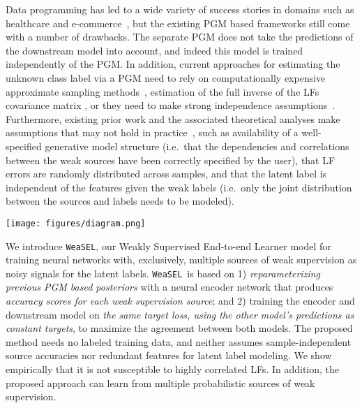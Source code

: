 \documentclass{article}
\newcommand{\weasel}{\texttt{WeaSEL}}\newcommand{\brackets}[1]{\left( #1 \right)}
\begin{document}
Data programming  has led to a wide variety of success stories in domains such as healthcare \cite{fries2019weakly,dunnmon2020cross} and e-commerce~\cite{Drybell}, but the existing PGM based frameworks still come with a number of drawbacks. 
The separate PGM does not take the predictions of the downstream model into account, and indeed this model is trained independently of the PGM.  
In addition, current approaches for estimating the unknown class label via a PGM need to rely on computationally expensive approximate sampling methods~\cite{DP}, estimation of the full inverse of the LFs covariance matrix \cite{Multitask}, or they need to make strong independence assumptions~\cite{triplets}.  
Furthermore, existing prior work and the associated theoretical analyses make assumptions that may not hold in practice~\cite{DP, Multitask, triplets}, such as availability of a  well-specified generative model structure (i.e.\ that the dependencies and correlations between the weak sources have been correctly specified by the user), that LF errors are randomly distributed across samples, and that the latent label is independent of the features given the weak labels (i.e.\ only the joint distribution between the sources and labels needs to be modeled).
\begin{figure*}
    \centering
\texttt{[image: figures/diagram.png]}
\vspace{-1mm}
    \caption{For a task with unobserved ground truth labels $y$, given $m$ sources of weak supervision $\lambda_i$ and training features $X$, \weasel\ trains a downstream model $f$  by maximizing the agreement of its predictions $y_f$ with probabilistic labels $y_e=P_\theta(y=c|\lfs)$ generated by reparameterizing the posterior of prior work with sample-dependent accuracy scores $\theta$ produced by an encoder network $e$.
    }
\label{fig:diagram}
\end{figure*}
 
We introduce \weasel, our Weakly Supervised End-to-end Learner model for training neural networks with, exclusively, multiple sources of weak supervision as noisy signals for the latent labels. \weasel\ is based on 1) \emph{reparameterizing previous PGM based posteriors} with a neural encoder network that produces \emph{accuracy scores for each weak supervision source}; and 2) training the encoder and downstream model on \emph{the same target loss, using the other model's predictions as constant targets}, to maximize the agreement between both models.
The proposed method needs no labeled training data, and neither assumes sample-independent source accuracies nor redundant features for latent label modeling. We show empirically that it is not susceptible to highly correlated LFs.
In addition, the proposed approach can learn from multiple probabilistic sources of weak supervision.
\end{document}
